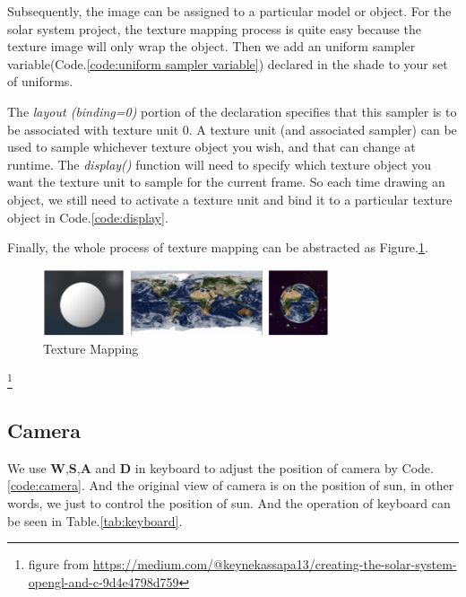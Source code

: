 \documentclass[12pt]{article}
\numberwithin{figure}{subsection}
\numberwithin{table}{subsection}
\numberwithin{equation}{subsection}
\begin{document}
Subsequently, the image can be assigned to a particular model or object. 
For the solar system project, the texture mapping process is quite easy because the texture image will only wrap the object. 
Then we add an uniform sampler variable(Code.\ref{code:uniform sampler variable}) declared in the shade to your set of uniforms.
\label{code:uniform sampler variable}

The \emph{layout (binding=0)} portion of the declaration
specifies that this sampler is to be associated with texture unit 0.
A texture unit (and associated sampler) can be used to sample whichever
texture object you wish, and that can change at runtime. The \emph{display()} function
will need to specify which texture object you want the texture unit to sample for
the current frame. So each time drawing an object, we still need to activate a
texture unit and bind it to a particular texture object in Code.\ref{code:display}.
\label{code:display}


Finally, the whole process of texture mapping can be abstracted as Figure.\ref{fig:how to texture}.
\begin{figure}[!htbp]
	\centering
	\includegraphics[width=0.75\textwidth]{image/how to texture.png}
	\caption{Texture Mapping}
    \label{fig:how to texture}
\end{figure}
\footnote{figure from \url{https://medium.com/@keynekassapa13/creating-the-solar-system-opengl-and-c-9d4e4798d759}}

\subsection{Camera}\label{sec:camera}
We use \textbf{W},\textbf{S},\textbf{A} and \textbf{D} in keyboard to adjust the 
position of camera by Code.\ref{code:camera}. 
And the original view of camera is on the position of sun, 
in other words, we just to control the position of sun.
And the operation of keyboard can be seen in Table.\ref{tab:keyboard}.
\label{code:camera}

\end{document}
